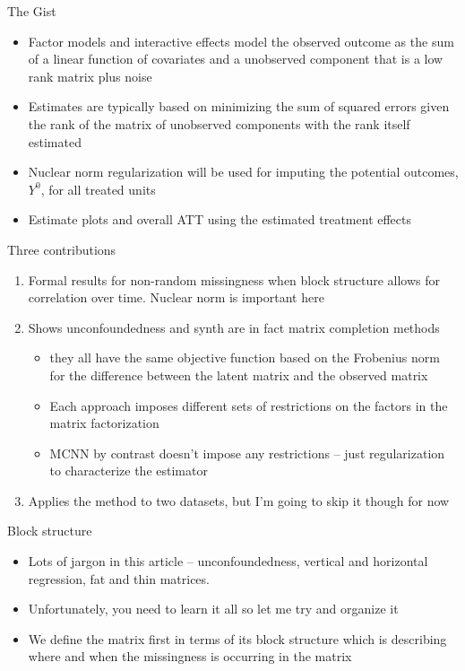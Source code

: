 \documentclass{beamer}
\begin{document}
\begin{frame}{The Gist}

\begin{itemize}
\item Factor models and interactive effects model the observed outcome as the sum of a linear function of covariates and a unobserved component that is a low rank matrix plus noise
\item Estimates are typically based on minimizing the sum of squared errors given the rank of the matrix of unobserved components with the rank itself estimated
\item Nuclear norm regularization will be used for imputing the potential outcomes, $Y^0$, for all treated units
\item Estimate plots and overall ATT using the estimated treatment effects
\end{itemize}

\end{frame}

\begin{frame}{Three contributions}

\begin{enumerate}
\item Formal results for non-random missingness when block structure allows for correlation over time.  Nuclear norm is important here
\item Shows unconfoundedness and synth are in fact matrix completion methods 
	\begin{itemize} 
	\item they all have the same objective function based on the Frobenius norm for the difference between the latent matrix and the observed matrix
	\item Each approach imposes different sets of restrictions on the factors in the matrix factorization
	\item MCNN by contrast doesn't impose any restrictions -- just regularization to characterize the estimator
	\end{itemize}
\item Applies the method to two datasets, but I'm going to skip it though for now
\end{enumerate}

\end{frame}


\begin{frame}{Block structure}

\begin{itemize}
\item Lots of jargon in this article -- unconfoundedness, vertical and horizontal regression, fat and thin matrices.  
\item Unfortunately, you need to learn it all so let me try and organize it
\item We define the matrix first in terms of its block structure which is describing where and when the missingness is occurring in the matrix
\end{itemize}

\end{frame}
\end{document}
